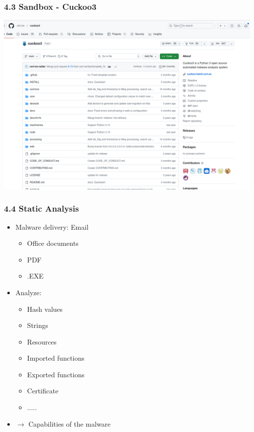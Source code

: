 \begin{frame}[fragile]
  \frametitle{4.3 Sandbox - Cuckoo3}
  \includegraphics[scale=0.21]{images/cuckoo.png}
\end{frame}


\begin{frame}[fragile]
  \frametitle{4.4 Static Analysis}
    \begin{itemize}
        \item Malware delivery: Email
        \begin{itemize}
            \item Office documents
            \item PDF
            \item .EXE
        \end{itemize}
        \item Analyze:
        \begin{itemize}
            \item Hash values
            \item Strings
            \item Resources
            \item Imported functions
            \item Exported functions
            \item Certificate
            \item .....
        \end{itemize}
        \item[] $\to$ Capabilities of the malware
    \end{itemize}
\end{frame}


